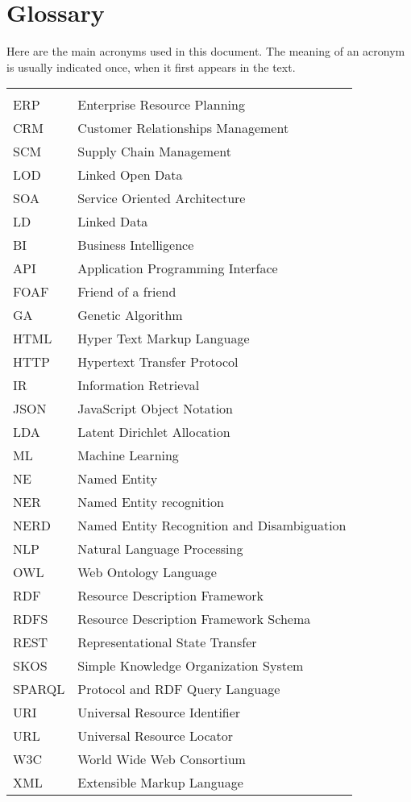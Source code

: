 \chapter*{Glossary}

Here are the main acronyms used in this document. The meaning of an acronym is usually indicated once, when it first appears in the text.

\begin{longtable}{lp{9cm}}
 &\\
 ERP &  Enterprise Resource Planning\\
 CRM & Customer Relationships Management\\
 SCM & Supply Chain Management\\
 LOD & Linked Open Data \\
 SOA & Service Oriented Architecture\\
 LD & Linked Data\\
 BI & Business Intelligence\\
 API  &   Application Programming Interface \\
 FOAF & Friend of a friend \\
 GA & Genetic Algorithm \\
 HTML &   Hyper Text Markup Language\\
 HTTP & Hypertext Transfer Protocol \\
 IR & Information Retrieval \\
 JSON & JavaScript Object Notation \\
 LDA & Latent Dirichlet Allocation \\
 ML & Machine Learning \\
 NE & Named Entity \\
 NER & Named Entity recognition\\
 NERD & Named Entity Recognition and Disambiguation \\
 NLP & Natural Language Processing \\
 OWL &  Web Ontology Language \\
 RDF  & Resource Description Framework\\
 RDFS & Resource Description Framework Schema \\
 REST & Representational State Transfer\\
 SKOS &  Simple Knowledge Organization System \\
 SPARQL & Protocol and RDF Query Language \\
 URI & Universal Resource Identifier \\
 URL & Universal Resource Locator \\
 W3C & World Wide Web Consortium \\
 XML & Extensible Markup Language
\end{longtable}

